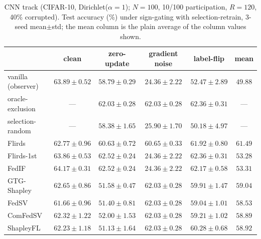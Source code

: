\documentclass[letterpaper]{article} %
\theoremstyle{definition} %
\begin{document}
\begin{table}[t]
\centering
\small
\caption{CNN track (CIFAR-10, Dirichlet($\alpha{=}1$); $N{=}100$, 10/100
participation, $R{=}120$, 40\% corrupted). Test accuracy (\%) under
sign-gating with selection-retrain, 3-seed mean$\pm$std; the mean column is
the plain average of the column values shown.}
\label{tab:cnn-intervention}
\begin{tabular}{lccccc}
\hline
 & clean & zero-update & gradient noise & label-flip & mean \\
\hline
vanilla (observer) & $63.89\pm0.52$ & $58.79\pm0.29$ & $24.36\pm2.22$ & $52.47\pm2.89$ & $49.88$ \\
oracle-exclusion & --- & $62.03\pm0.28$ & $62.03\pm0.28$ & $62.36\pm0.31$ & --- \\
selection-random & --- & $58.38\pm1.65$ & $25.90\pm1.70$ & $50.18\pm4.97$ & --- \\
Flirds & $62.77\pm0.96$ & $60.63\pm0.72$ & $60.65\pm0.33$ & $61.92\pm0.80$ & $61.49$ \\
Flirds-1st & $63.86\pm0.53$ & $62.52\pm0.24$ & $24.36\pm2.22$ & $62.36\pm0.31$ & $53.28$ \\
FedIF & $64.17\pm0.31$ & $62.52\pm0.24$ & $24.36\pm2.22$ & $62.17\pm0.58$ & $53.31$ \\
GTG-Shapley & $62.65\pm0.86$ & $51.58\pm0.47$ & $62.03\pm0.28$ & $59.91\pm1.47$ & $59.04$ \\
FedSV & $61.66\pm0.96$ & $51.40\pm0.81$ & $62.03\pm0.28$ & $59.04\pm1.01$ & $58.53$ \\
ComFedSV & $62.32\pm1.22$ & $52.00\pm1.53$ & $62.03\pm0.28$ & $59.21\pm1.02$ & $58.89$ \\
ShapleyFL & $62.23\pm1.18$ & $51.13\pm1.64$ & $62.03\pm0.28$ & $60.28\pm0.68$ & $58.92$ \\
\hline
\end{tabular}
\end{table}
\end{document}
